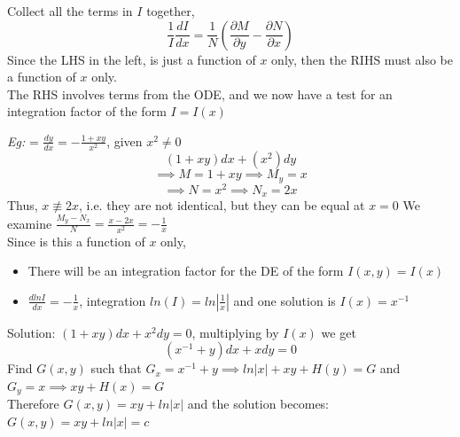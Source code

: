 \documentclass[11pt]{article}
\theoremstyle{definition}
\begin{document}
Collect all the terms in $I$ together,
$$\frac{1}{I}\frac{dI}{dx} = \frac{1}{N}(\frac{\partial M}{\partial y} - \frac{\partial N}{\partial x})$$
Since the LHS in the left, is just a function of $x$ only, then the RIHS must also be a function of $x$ only.\\
The RHS involves terms from the ODE, and we now have a test for an integration factor of the form $I = I(x)$

\textit{Eg:} = $\frac{dy}{dx} = -\frac{1+xy}{x^2}$, given $x^2 \neq 0$
$$(1+xy)dx + (x^2)dy$$
$$\implies M = 1+xy \implies M_y = x$$
$$\implies N = x^2 \implies N_x = 2x$$
Thus, $x \not\equiv 2x$, i.e. they are not identical, but they can be equal at $x = 0$
We examine $\frac{M_y - N_x}{N} = \frac{x-2x}{x^2} = -\frac{1}{x}$\\
Since is this a function of $x$ only, 
\begin{itemize}
    \item There will be an integration factor for the DE of the form $I(x,y) = I(x)$
    \item $\frac{dlnI}{dx} = -\frac{1}{x}$, integration $ln(I) = ln|\frac{1}{x}|$ and one solution is $I(x) = x^{-1}$
\end{itemize}
Solution: $(1+xy)dx + x^2dy = 0$, multiplying by $I(x)$ we get $$(x^{-1} +y)dx + xdy = 0$$
Find $G(x,y)$ such that $G_x = x^{-1} + y \implies ln|x| + xy + H(y) = G$
and $G_y = x \implies xy + H(x) = G$\\
Therefore $G(x,y) = xy + ln|x|$ and the solution becomes: $G(x,y) = xy + ln|x| = c$\\
\end{document}
